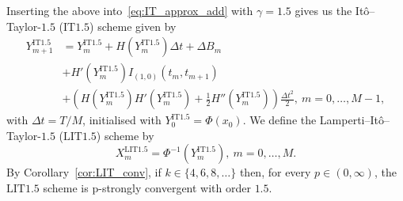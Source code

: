 \documentclass[11pt]{amsart}
\newcommand{\IT}{\textrm{IT}}
\newcommand{\LIT}{\textrm{LIT}}
\begin{document}
{Inserting the above into~\eqref{eq:IT_approx_add} with $\gamma = 1.5$ gives us the Itô--Taylor-$1.5$ ($\IT 1.5$) scheme given by
\begin{equation*}\label{eq:IT_15_add}
  \begin{split}
    Y^{\IT 1.5}_{m+1} &= Y^{\IT 1.5}_{m} + H(Y^{\IT 1.5}_{m}) \Delta t + \Delta B_{m} \\ &+ H'(Y^{\IT 1.5}_{m}) I_{(1,0)}(t_{m},t_{m+1}) \\ &+ \left( H(Y^{\IT 1.5}_{m}) H'(Y^{\IT 1.5}_{m}) + \frac{1}{2} H''(Y^{\IT 1.5}_{m}) \right) \frac{\Delta t^{2}}{2},\ m=0,\ldots,M-1,
  \end{split}
\end{equation*}
with $\Delta t = T/M$, initialised with $Y^{\IT 1.5}_{0} = \Phi(x_{0})$. We define the Lamperti--Itô--Taylor-$1.5$ ($\LIT 1.5$) scheme by
\begin{equation}\label{eq:LIT_15_add}
X^{\LIT 1.5}_{m} = \Phi^{-1}(Y^{\IT 1.5}_{m}),\ m=0,\ldots,M.
\end{equation}
By Corollary~\ref{cor:LIT_conv}, if $k \in \{4,6,8, \ldots \}$ then, for every $p \in (0,\infty)$, the $\LIT 1.5$ scheme is p-strongly convergent with order $1.5$.

}
\end{document}

